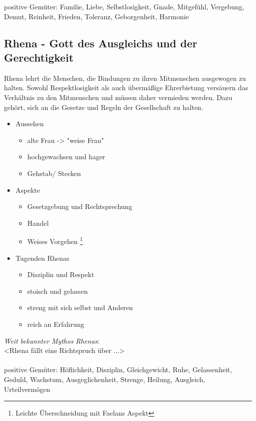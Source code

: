 positive Gemüter: Familie, Liebe, Selbstlosigkeit, Gnade, Mitgefühl, Vergebung, Demut, Reinheit, Frieden, Toleranz, Geborgenheit, Harmonie

\subsection{\textbf{Rhena} - Gott des Ausgleichs und der Gerechtigkeit}
Rhena lehrt die Menschen, die Bindungen zu ihren Mitmenschen ausgewogen zu halten. Sowohl Respektlosigkeit als auch übermäßige Ehrerbietung versäuern das Verhältnis 
zu den Mitmenschen und müssen daher vermieden werden. Dazu gehört, sich an die Gesetze und Regeln der Gesellschaft zu halten.\\
\begin{itemize}
	\item Aussehen 
	\begin{itemize}
		\item alte Frau  -> "weise Frau"
		\item hochgewachsen und hager
		\item Gehstab/ Stecken
	\end{itemize}
	\item Aspekte
	\begin{itemize}
		\item Gesetzgebung und Rechtsprechung
		\item Handel
		\item Weises Vorgehen \footnote{Leichte Überschneidung mit Faelans Aspekt}
	\end{itemize}
	\item Tugenden Rhenas
	\begin{itemize}
		\item Disziplin und Respekt
		\item stoisch und gelassen
		\item streng mit sich selbst und Anderen
		\item reich an Erfahrung
	\end{itemize}
\end{itemize}
\textit{Weit bekannter Mythos Rhenas}:\\
<Rhena fällt eine Richtspruch über ...>\\~\\
positive Gemüter: Höflichkeit, Disziplin, Gleichgewicht, Ruhe, Gelassenheit, Geduld, Wachstum, Ausgeglichenheit, Strenge, Heilung, Ausgleich, Urteilvermögen


